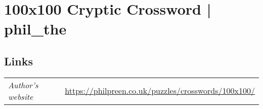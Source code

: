 \section{100x100 Cryptic Crossword | {\normalfont phil\_the}}
\label{sec:07-100x100-cryptic-crossword-phil-the}

\subsection*{Links}
\begin{tabularx}{\textwidth}{l X}
\emph{Author's website} & \url{https://philpreen.co.uk/puzzles/crosswords/100x100/} \\
\end{tabularx}
\pagebreak
